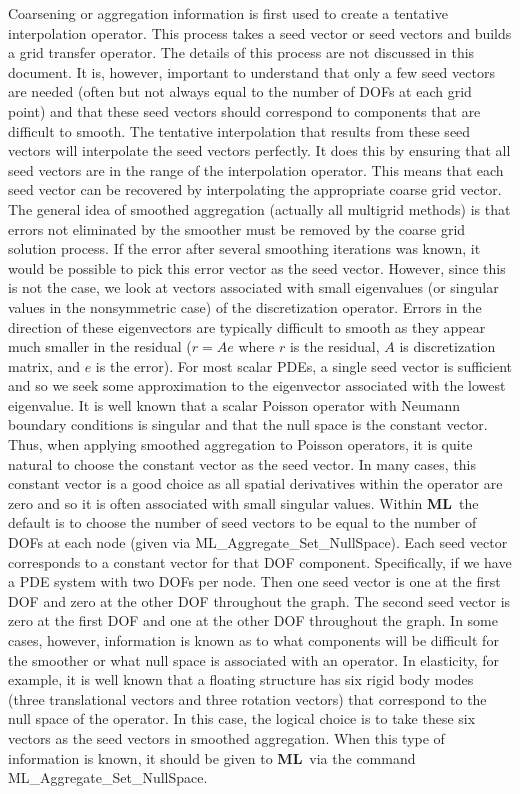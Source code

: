 \documentclass{article}[11pt]
\newcommand{\ML}     {{\bf ML}}
\begin{document}
Coarsening or aggregation information is first used to create a
tentative interpolation operator.  This process takes a seed vector or
seed vectors and builds a grid transfer operator. The details of this
process are not discussed in this document.  It is, however, important
to understand that only a few seed vectors are needed (often but not
always equal to the number of DOFs at each grid point) and that these
seed vectors should correspond to components that are difficult to
smooth.  The tentative interpolation that results from these seed
vectors will interpolate the seed vectors perfectly.  It does this by
ensuring that all seed vectors are in the range of the interpolation
operator.  This means that each seed vector can be recovered by
interpolating the appropriate coarse grid vector.  The general idea of
smoothed aggregation (actually all multigrid methods) is that errors not
eliminated by the smoother must be removed by the coarse grid solution
process.  If the error after several smoothing iterations was known, it
would be possible to pick this error vector as the seed vector. However,
since this is not the case, we look at vectors associated with small
eigenvalues (or singular values in the nonsymmetric case) of the
discretization operator.  Errors in the direction of these eigenvectors
are typically difficult to smooth as they appear much smaller in the
residual ($ r = A e $ where $r$ is the residual, $A$ is discretization
matrix, and $e$ is the error).  For most scalar PDEs, a single seed
vector is sufficient and so we seek some approximation to the
eigenvector associated with the lowest eigenvalue.  It is well known
that a scalar Poisson operator with Neumann boundary conditions is
singular and that the null space is the constant vector. Thus, when
applying smoothed aggregation to Poisson operators, it is quite natural
to choose the constant vector as the seed vector.  In many cases, this
constant vector is a good choice as all spatial derivatives within the
operator are zero and so it is often associated with small singular
values. Within \ML\ the default is to choose the number of seed vectors
to be equal to the number of DOFs at each node (given via {\sf
  ML\_Aggregate\_Set\_NullSpace}).  Each seed vector corresponds to a
constant vector for that DOF component.  Specifically, if we have a PDE
system with two DOFs per node. Then one seed vector is one at the first
DOF and zero at the other DOF throughout the graph. The second seed
vector is zero at the first DOF and one at the other DOF throughout the
graph.  In some cases, however, information is known as to what
components will be difficult for the smoother or what null space is
associated with an operator.  In elasticity, for example, it is well
known that a floating structure has six rigid body modes (three
translational vectors and three rotation vectors) that correspond to the
null space of the operator.  In this case, the logical choice is to take
these six vectors as the seed vectors in smoothed aggregation. When this
type of information is known, it should be given to \ML\ via the command
{\sf ML\_Aggregate\_Set\_NullSpace}.
\end{document}
